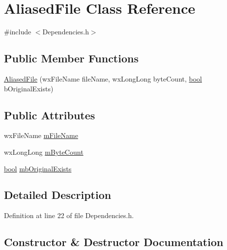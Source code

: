 \hypertarget{class_aliased_file}{}\section{Aliased\+File Class Reference}
\label{class_aliased_file}


{\ttfamily \#include $<$Dependencies.\+h$>$}

\subsection*{Public Member Functions}
\begin{DoxyCompactItemize}
\item 
\hyperlink{class_aliased_file_ad5fe8f264595548418b091f5e86ebf5c}{Aliased\+File} (wx\+File\+Name file\+Name, wx\+Long\+Long byte\+Count, \hyperlink{mac_2config_2i386_2lib-src_2libsoxr_2soxr-config_8h_abb452686968e48b67397da5f97445f5b}{bool} b\+Original\+Exists)
\end{DoxyCompactItemize}
\subsection*{Public Attributes}
\begin{DoxyCompactItemize}
\item 
wx\+File\+Name \hyperlink{class_aliased_file_a83062f1072558a69ad9f5a871967abc9}{m\+File\+Name}
\item 
wx\+Long\+Long \hyperlink{class_aliased_file_a235a93bd3421ab86bba6dd8b451e38e4}{m\+Byte\+Count}
\item 
\hyperlink{mac_2config_2i386_2lib-src_2libsoxr_2soxr-config_8h_abb452686968e48b67397da5f97445f5b}{bool} \hyperlink{class_aliased_file_a0b0355722812ab41ec2c3298605947a9}{mb\+Original\+Exists}
\end{DoxyCompactItemize}


\subsection{Detailed Description}


Definition at line 22 of file Dependencies.\+h.



\subsection{Constructor \& Destructor Documentation}
